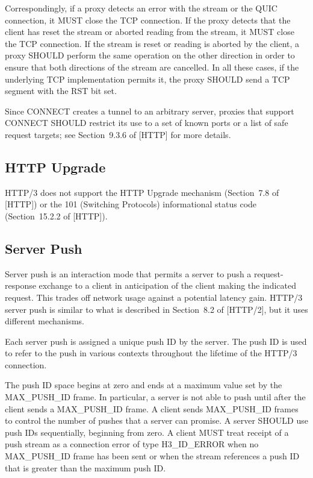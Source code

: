 \documentclass{article}
\begin{document}
\begin{itemize}
Correspondingly, if a proxy detects an error with the stream or the QUIC connection, it MUST close the TCP connection.  If the proxy detects that the client has reset the stream or aborted reading from the stream, it MUST close the TCP connection.  If the stream is reset or reading is aborted by the client, a proxy SHOULD perform the same operation on the other direction in order to ensure that both directions of the stream are cancelled.  In all these cases, if the underlying TCP implementation permits it, the proxy SHOULD send a TCP segment with the RST bit set.

Since CONNECT creates a tunnel to an arbitrary server, proxies that support CONNECT SHOULD restrict its use to a set of known ports or a list of safe request targets; see Section~9.3.6 of [HTTP] for more details.

\end{itemize}
\subsection{HTTP Upgrade}

HTTP/3 does not support the HTTP Upgrade mechanism (Section~7.8 of [HTTP]) or the 101 (Switching Protocols) informational status code (Section~15.2.2 of [HTTP]).

\subsection{Server Push}

Server push is an interaction mode that permits a server to push a request-response exchange to a client in anticipation of the client making the indicated request.  This trades off network usage against a potential latency gain.  HTTP/3 server push is similar to what is described in Section~8.2 of [HTTP/2], but it uses different mechanisms.

Each server push is assigned a unique push ID by the server.  The push ID is used to refer to the push in various contexts throughout the lifetime of the HTTP/3 connection.

The push ID space begins at zero and ends at a maximum value set by the MAX\_PUSH\_ID frame.  In particular, a server is not able to push until after the client sends a MAX\_PUSH\_ID frame.  A client sends MAX\_PUSH\_ID frames to control the number of pushes that a server can promise.  A server SHOULD use push IDs sequentially, beginning from zero.  A client MUST treat receipt of a push stream as a connection error of type H3\_ID\_ERROR when no MAX\_PUSH\_ID frame has been sent or when the stream references a push ID that is greater than the maximum push ID.
\end{document}
